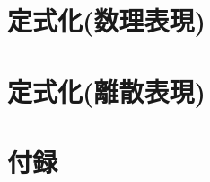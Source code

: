 \documentclass[a4j,12pt,openbib,oneside]{jreport}
\begin{document}
\chapter{定式化(数理表現)} %




\chapter{定式化(離散表現)} %
%

\chapter{付録} %




\end{document}
